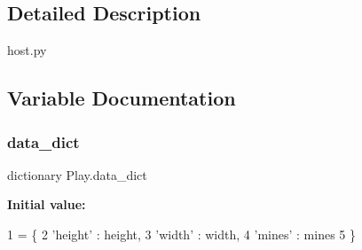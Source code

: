 \subsection{Detailed Description}
\begin{DoxyVerb}host.py
\end{DoxyVerb}
 

\subsection{Variable Documentation}
\mbox{\label{namespace_play_a672e7194661c43e0e9bfefa8a22e93de}} 
\subsubsection{\texorpdfstring{data\+\_\+dict}{data\_dict}}
{\footnotesize\ttfamily dictionary Play.\+data\+\_\+dict}

{\bfseries Initial value\+:}
\begin{DoxyCode}
1 =  \{
2             \textcolor{stringliteral}{'height'} : height,
3             \textcolor{stringliteral}{'width'} : width,
4             \textcolor{stringliteral}{'mines'} : mines
5         \}
\end{DoxyCode}
